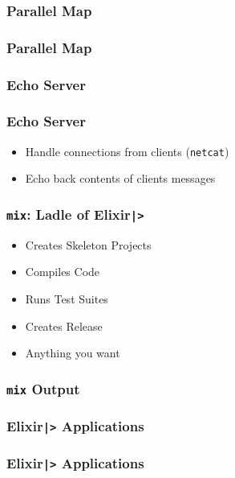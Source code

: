 \documentclass[english]{beamer}
\begin{document}
\begin{frame}[fragile]
\frametitle{Parallel Map}

\end{frame}

\begin{frame}[fragile]
\frametitle{Parallel Map}

\end{frame}

\subsubsection{Echo Server}
\begin{frame}
\frametitle{Echo Server}
\begin{itemize}
\item<2->{Handle connections from clients (\texttt{netcat})}
\item<3->{Echo back contents of clients messages}
\end{itemize}
\end{frame}

\begin{frame}
\frametitle{\texttt{mix}: Ladle of Elixir\texttt{|>}}
\begin{itemize}
\item<1->{Creates Skeleton Projects}
\item<2->{Compiles Code}
\item<3->{Runs Test Suites}
\item<4->{Creates Release}
\item<5->{Anything you want}
\end{itemize}
\end{frame}

\begin{frame}[fragile]
\frametitle{\texttt{mix} Output}

\end{frame}

\begin{frame}[fragile]
\frametitle{Elixir\texttt{|>} Applications}

\end{frame}

\begin{frame}[fragile]
\frametitle{Elixir\texttt{|>} Applications}

\end{frame}
\end{document}
